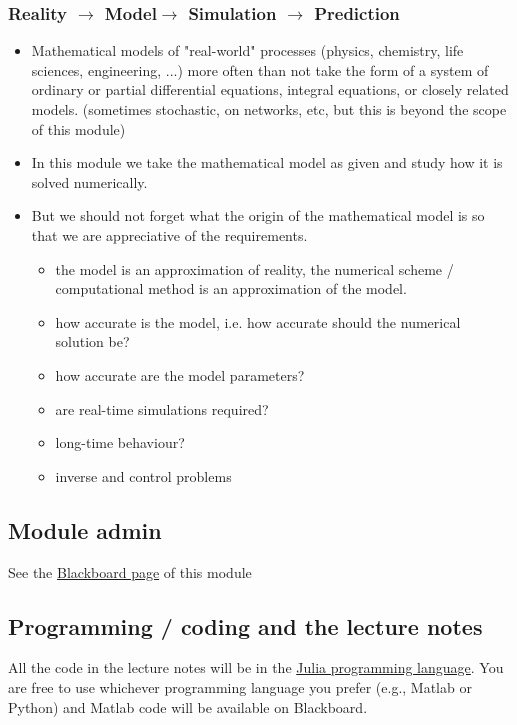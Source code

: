 \documentclass[12pt,a4paper]{article}
\begin{document}
\subsubsection{Reality $\rightarrow$ Model$\rightarrow$ Simulation $\rightarrow$ Prediction}
\begin{itemize}
\item Mathematical models of "real-world" processes (physics, chemistry, life sciences, engineering, ...) more often than not take the form of a system of ordinary or partial differential equations, integral equations, or closely related models. (sometimes stochastic, on networks, etc, but this is beyond the scope of this module) 


\item In this module we take the mathematical model as given and study how it is solved numerically.


\item But we should not forget what the origin of the mathematical model is so that we are appreciative of the requirements. 

\begin{itemize}
\item the model is an approximation of reality, the numerical scheme / computational method is an approximation of the model.


\item how accurate is the model, i.e. how accurate should the numerical solution be? 


\item how accurate are the model parameters? 


\item are real-time simulations required?


\item long-time behaviour? 


\item inverse and control problems

\end{itemize}
\end{itemize}
\subsection{Module admin}
See the \href{https://blackboard.le.ac.uk/}{Blackboard page} of this module

\subsection{Programming / coding and the lecture notes}
All the code in the lecture notes will be in the \href{https://julialang.org/}{Julia programming language}. You are free to use whichever programming language you prefer (e.g., Matlab or Python) and Matlab code will be available on Blackboard.
\end{document}

